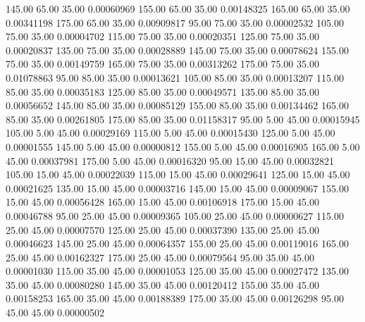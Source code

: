    145.00     65.00     35.00     0.00060969
    155.00     65.00     35.00     0.00148325
    165.00     65.00     35.00     0.00341198
    175.00     65.00     35.00     0.00909817
     95.00     75.00     35.00     0.00002532
    105.00     75.00     35.00     0.00004702
    115.00     75.00     35.00     0.00020351
    125.00     75.00     35.00     0.00020837
    135.00     75.00     35.00     0.00028889
    145.00     75.00     35.00     0.00078624
    155.00     75.00     35.00     0.00149759
    165.00     75.00     35.00     0.00313262
    175.00     75.00     35.00     0.01078863
     95.00     85.00     35.00     0.00013621
    105.00     85.00     35.00     0.00013207
    115.00     85.00     35.00     0.00035183
    125.00     85.00     35.00     0.00049571
    135.00     85.00     35.00     0.00056652
    145.00     85.00     35.00     0.00085129
    155.00     85.00     35.00     0.00134462
    165.00     85.00     35.00     0.00261805
    175.00     85.00     35.00     0.01158317
     95.00      5.00     45.00     0.00015945
    105.00      5.00     45.00     0.00029169
    115.00      5.00     45.00     0.00015430
    125.00      5.00     45.00     0.00001555
    145.00      5.00     45.00     0.00000812
    155.00      5.00     45.00     0.00016905
    165.00      5.00     45.00     0.00037981
    175.00      5.00     45.00     0.00016320
     95.00     15.00     45.00     0.00032821
    105.00     15.00     45.00     0.00022039
    115.00     15.00     45.00     0.00029641
    125.00     15.00     45.00     0.00021625
    135.00     15.00     45.00     0.00003716
    145.00     15.00     45.00     0.00009067
    155.00     15.00     45.00     0.00056428
    165.00     15.00     45.00     0.00106918
    175.00     15.00     45.00     0.00046788
     95.00     25.00     45.00     0.00009365
    105.00     25.00     45.00     0.00000627
    115.00     25.00     45.00     0.00007570
    125.00     25.00     45.00     0.00037390
    135.00     25.00     45.00     0.00046623
    145.00     25.00     45.00     0.00064357
    155.00     25.00     45.00     0.00119016
    165.00     25.00     45.00     0.00162327
    175.00     25.00     45.00     0.00079564
     95.00     35.00     45.00     0.00001030
    115.00     35.00     45.00     0.00001053
    125.00     35.00     45.00     0.00027472
    135.00     35.00     45.00     0.00080280
    145.00     35.00     45.00     0.00120412
    155.00     35.00     45.00     0.00158253
    165.00     35.00     45.00     0.00188389
    175.00     35.00     45.00     0.00126298
     95.00     45.00     45.00     0.00000502
